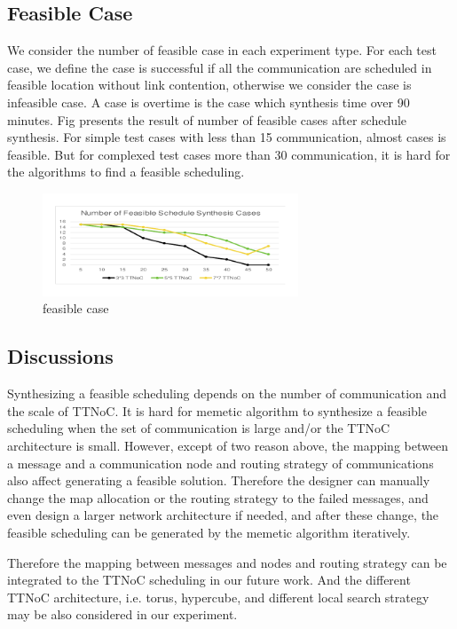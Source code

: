 \documentclass[journal]{IEEEtran}
\begin{document}
\subsection{Feasible Case}

We consider the number of feasible  case in each experiment type. For each test case, we define the case is successful if all the communication are scheduled in feasible location without link contention, otherwise we consider the case is infeasible case. A case is overtime is the case which synthesis time over 90 minutes. Fig presents the result of number of feasible cases after schedule synthesis. For simple test cases with less than 15 communication, almost cases is feasible. But for complexed test cases more than 30 communication, it is hard for the algorithms to find a feasible scheduling.
\begin{figure}[!t]
	\centering
	\includegraphics[width=3in]{picture/feasible}
	\caption{feasible case}
	\label{f:feasible}
\end{figure}

\subsection{Discussions}

Synthesizing a feasible scheduling depends on the number of communication and the scale of TTNoC. It is hard for memetic algorithm to synthesize a feasible scheduling when the set of communication is large and/or the TTNoC architecture is small. However, except of two reason above, the mapping between a message and a communication node and routing strategy of communications also affect generating a feasible solution. Therefore the designer can manually change the map allocation or the routing strategy to the failed messages, and even design a larger network architecture if needed, and after these change, the feasible scheduling can be generated by the memetic algorithm iteratively. 

Therefore the mapping between messages and nodes and routing strategy can be integrated to the TTNoC scheduling in our future work. And the different TTNoC architecture, i.e. torus, hypercube, and different local search strategy may be also considered in our experiment.
\end{document}
